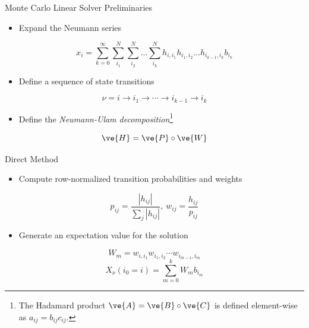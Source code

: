 \documentclass{beamer}
\begin{document}
\begin{frame}{Monte Carlo Linear Solver Preliminaries}

  \begin{itemize}
  \item Expand the Neumann series
  \end{itemize}

  \[
  x_i = \sum_{k=0}^{\infty}\sum_{i_1}^{N}\sum_{i_2}^{N}\ldots
  \sum_{i_k}^{N}h_{i,i_1}h_{i_1,i_2}\ldots h_{i_{k-1},i_k}b_{i_k}
  \]

  \begin{itemize}
  \item Define a sequence of state transitions
  \end{itemize}
  
  \[
  \nu = i \rightarrow i_1 \rightarrow \cdots \rightarrow i_{k-1}
  \rightarrow i_{k}
  \]

  \medskip
  \begin{itemize}
  \item Define the \textit{Neumann-Ulam decomposition}\footnote{The
    Hadamard product $\ve{A} = \ve{B} \circ \ve{C}$ is defined
    element-wise as $a_{ij} = b_{ij} c_{ij}$.}
  \end{itemize}

  \[
  \ve{H} = \ve{P} \circ \ve{W}
  \]

\end{frame}

\begin{frame}{Direct Method}

  \begin{itemize}
  \item Compute row-normalized transition probabilities and weights
  \end{itemize}

  \[
  p_{ij} = \frac{|h_{ij}|}{\sum_j |h_{ij}|},\ w_{ij} =
  \frac{h_{ij}}{p_{ij}}
  \]

  \medskip \medskip
  \begin{itemize}
  \item Generate an expectation value for the solution
  \end{itemize}

  \[
  W_{m} = w_{i,i_1} w_{i_1,i_2} \cdots w_{i_{m-1},i_m}
  \]
  \[
  X_{\nu}(i_0 = i) = \sum_{m=0}^k W_{m} b_{i_m}
  \]
\end{frame}
\end{document}
